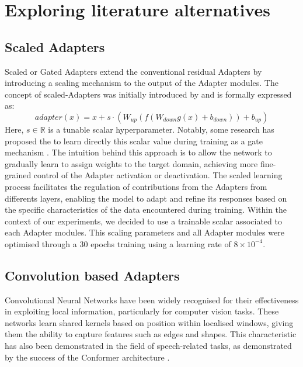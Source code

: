 \section{Exploring literature alternatives}
\subsection{Scaled Adapters}
Scaled or Gated Adapters extend the conventional residual Adapters by introducing a scaling mechanism to the output of the Adapter modules. The concept of scaled-Adapters was initially introduced by \cite{he2022towards} and is formally expressed as:
\begin{equation}
    adapter(x) = x + s \cdot (W_{up}(f(W_{down}g(x) + b_{down})) + b_{up})    
\end{equation}
Here, $s \in \mathbb{R}$ is a tunable scalar hyperparameter. Notably, some research has proposed the to learn directly this scalar value during training as a gate mechanism \cite{mao-etal-2022-unipelt}. The intuition behind this approach is to allow the network to gradually learn to assign weights to the target domain, achieving more fine-grained control of the Adapter activation or deactivation. The scaled learning process facilitates the regulation of contributions from the Adapters from differents layers, enabling the model to adapt and refine its responses based on the specific characteristics of the data encountered during training.
Within the context of our experiments, we decided to use a trainable scalar associated to each Adapter modules. This scaling parameters and all Adapter modules were optimised through a 30 epochs training using a learning rate of $8 \times 10^{-4}$.

\subsection{Convolution based Adapters}
Convolutional Neural Networks have been widely recognised for their effectiveness in exploiting local information, particularly for computer vision tasks. These networks learn shared kernels based on position within localised windows, giving them the ability to capture features such as edges and shapes. This characteristic has also been demonstrated in the field of speech-related tasks, as demonstrated by the success of the Conformer architecture \cite{gulati2020conformer}.

